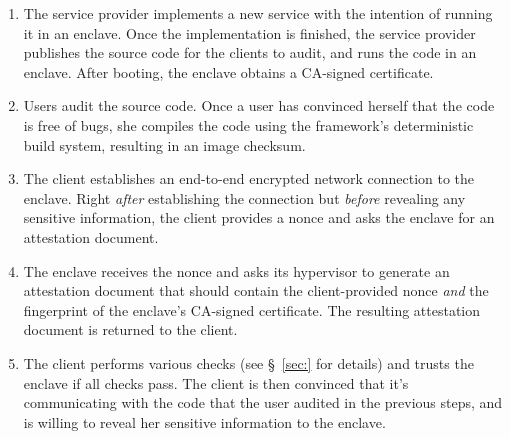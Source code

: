 \begin{enumerate}
    \item The service provider implements a new service with the intention of running it in an enclave.  Once the implementation is finished, the service provider publishes the source code for the clients to audit, and runs the code in an enclave.  After booting, the enclave obtains a CA-signed certificate.
    \item Users audit the source code.  Once a user has convinced herself that the code is free of bugs, she compiles the code using the framework's deterministic build system, resulting in an image checksum.
    \item The client establishes an end-to-end encrypted network connection to the enclave.  Right \emph{after} establishing the connection but \emph{before} revealing any sensitive information, the client provides a nonce and asks the enclave for an attestation document.
    \item The enclave receives the nonce and asks its hypervisor to generate an attestation document that should contain the client-provided nonce \emph{and} the fingerprint of the enclave's CA-signed certificate.  The resulting attestation document is returned to the client.
    \item The client performs various checks (see \S~\ref{sec:} for details) and trusts the enclave if all checks pass.  The client is then convinced that it's communicating with the code that the user audited in the previous steps, and is willing to reveal her sensitive information to the enclave.
\end{enumerate}



